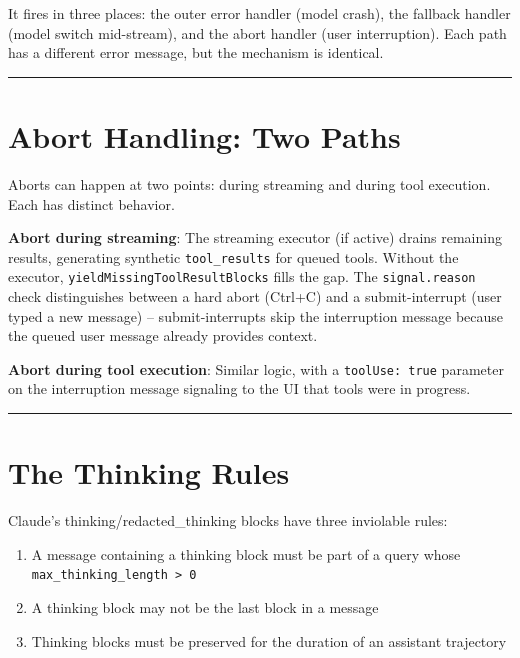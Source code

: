 \documentclass[
  english,
  11pt,
  letterpaper,
]{book}
\providecommand{\tightlist}{%
  \setlength{\itemsep}{0pt}\setlength{\parskip}{0pt}}
\begin{document}
It fires in three places: the outer error handler (model crash), the
fallback handler (model switch mid-stream), and the abort handler (user
interruption). Each path has a different error message, but the
mechanism is identical.

\begin{center}\rule{0.5\linewidth}{0.5pt}\end{center}

\section{Abort Handling: Two Paths}\label{abort-handling-two-paths}

Aborts can happen at two points: during streaming and during tool
execution. Each has distinct behavior.

\textbf{Abort during streaming}: The streaming executor (if active)
drains remaining results, generating synthetic \texttt{tool\_results}
for queued tools. Without the executor,
\texttt{yieldMissingToolResultBlocks} fills the gap. The
\texttt{signal.reason} check distinguishes between a hard abort (Ctrl+C)
and a submit-interrupt (user typed a new message) -- submit-interrupts
skip the interruption message because the queued user message already
provides context.

\textbf{Abort during tool execution}: Similar logic, with a
\texttt{toolUse:\ true} parameter on the interruption message signaling
to the UI that tools were in progress.

\begin{center}\rule{0.5\linewidth}{0.5pt}\end{center}

\section{The Thinking Rules}\label{the-thinking-rules}

Claude's thinking/redacted\_thinking blocks have three inviolable rules:

\begin{enumerate}
\def\labelenumi{\arabic{enumi}.}
\tightlist
\item
  A message containing a thinking block must be part of a query whose
  \texttt{max\_thinking\_length\ \textgreater{}\ 0}
\item
  A thinking block may not be the last block in a message
\item
  Thinking blocks must be preserved for the duration of an assistant
  trajectory
\end{enumerate}
\end{document}
